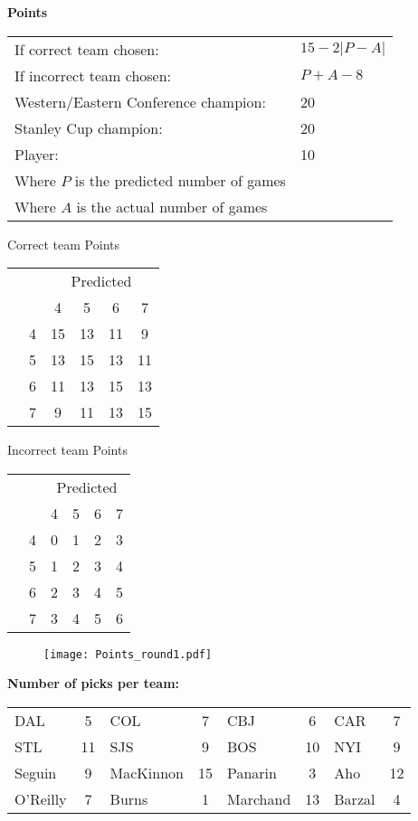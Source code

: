 \documentclass[10pt]{article}
\newcommand{\mccn}[2]{\multicolumn{#1}{c}{#2}}
\begin{document}
\begin{table}[!htb]
    \begin{minipage}[t]{.27\linewidth}
    	{\bf Points}\\
		\begin{tabular}{l l}
			If correct team chosen:	& $15 - 2|P-A|$\\
			If incorrect team chosen:	& $P+A-8$\\
			Western/Eastern Conference champion:	& 20\\
			Stanley Cup champion:		& 20\\
			Player:		& 10\\
			Where $P$ is the predicted number of games&\\
			Where $A$ is the actual number of games&
		\end{tabular}
	\end{minipage}
	\begin{minipage}[t]{0.12\linewidth}
	\qquad Correct team Points\\
	\begin{tabular}{c l | c c c c }
		\mccn{2}{} & \mccn{4}{Predicted}\\
		& & 4 & 5 & 6 & 7\\\cline{2-6}
		\parbox[t]{2mm}{}&4 & 15 & 13 & 11 & 9\\
		&5 & 13 & 15 & 13 & 11\\
		&6 & 11 & 13 & 15 & 13\\
		&7 &  9 & 11 & 13 & 15
	\end{tabular}
	\end{minipage}
	\begin{minipage}[t]{0.12\linewidth}
	\quad Incorrect team Points\\
	\begin{tabular}{c l | c c c c }
		\mccn{2}{} & \mccn{4}{Predicted}\\
		& & 4 & 5 & 6 & 7\\\cline{2-6}
		\parbox[t]{2mm}{}&4 & 0 & 1 & 2 & 3\\
		&5 & 1 & 2 & 3 & 4\\
		&6 & 2 & 3 & 4 & 5\\
		&7 & 3 & 4 & 5 & 6
	\end{tabular}
\begin{wrapfigure}{r}{0.01\textwidth}
    \vspace{-3.6cm}
	\texttt{[image: Points\_round1.pdf]}
\end{wrapfigure}
	\end{minipage}
\end{table}
    \begin{minipage}[t]{.45\linewidth}
    	{\bf Number of picks per team:}\\
\begin{tabular}{lc | lc | lc | lc }
DAL&5&COL&7&CBJ&6&CAR&7\\
STL&11&SJS&9&BOS&10&NYI&9\\
Seguin&9&MacKinnon&15&Panarin&3&Aho&12\\
O'Reilly&7&Burns&1&Marchand&13&Barzal&4\\
        \end{tabular}
	\end{minipage}
\end{document}
